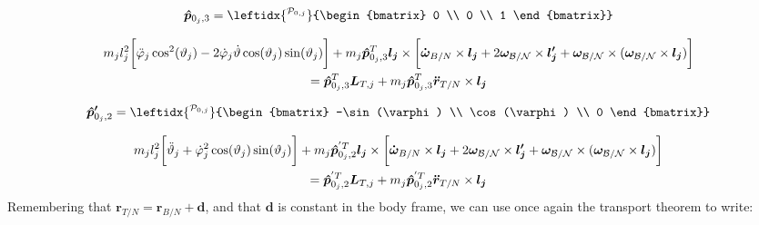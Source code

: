 \documentclass[]{BasiliskReportMemo}
\begin{document}
	\begin{equation}
	\bm{\hat{p}}_{0_j,3}=
	\leftidx{^{\mathcal{P}_{0,j}}}
	{\begin{bmatrix}
	0 \\ 0 \\ 1
	\end{bmatrix}}
	\end{equation}
	

	\begin{multline}
	m_j l_j^2\bigg[\ddot{\varphi}_j\cos^2(\vartheta_j)-2\dot{\varphi}_j\dot{\vartheta}\cos(\vartheta_j)\sin(\vartheta_j)\bigg] + m_j \bm{\hat{p}}_{0_j,3}^T \bm{l_j}\times \bigg[\bm{\dot{\omega}}_{B/N}\times \bm{l_j} + 2\bm\omega_{\cal B/N}\times \bm{l_j'}+\bm\omega_{\cal B/N}\times(\bm\omega_{\cal B/N}\times \bm{l_j})\bigg]\\
	=\bm{\hat{p}}_{0_j,3}^T \bm{L}_{T,j}+m_{j} \bm{\hat{p}}_{0_j,3}^T \bm{\ddot{r}}_{T/N}\times \bm{l_j}
	\label{eq:FSE4}
	\end{multline}
	
	\begin{equation}
	\bm{\hat{p}'}_{0_j,2}=
	\leftidx{^{\mathcal{P}_{0,j}}}
	{\begin{bmatrix}
	-\sin(\varphi) \\ \cos(\varphi) \\ 0
	\end{bmatrix}}
	\end{equation}
	
	\begin{multline}
	m_j l_j^2\bigg[\ddot{\vartheta}_j+\dot{\varphi}_j^2\cos(\vartheta_j)\sin(\vartheta_j)\bigg] + m_j \bm{\hat{p}}_{0_j,2}^{'T} \bm{l_j}\times \bigg[\bm{\dot{\omega}}_{B/N}\times \bm{l_j} + 2\bm\omega_{\cal B/N}\times \bm{l_j'}+\bm\omega_{\cal B/N}\times(\bm\omega_{\cal B/N}\times \bm{l_j})\bigg]\\
	=\bm{\hat{p}}_{0_j,2}^{'T} \bm{L}_{T,j}+m_{j} \bm{\hat{p}}_{0_j,2}^{'T} \bm{\ddot{r}}_{T/N}\times \bm{l_j}
	\label{eq:FSE5}
	\end{multline}
	Remembering that $\bm{r}_{T/N} = \bm{r}_{B/N} + \bm{d}$, and that $\bm{d}$ is constant in the body frame, we can use once again the transport theorem to write:
	
\end{document}
